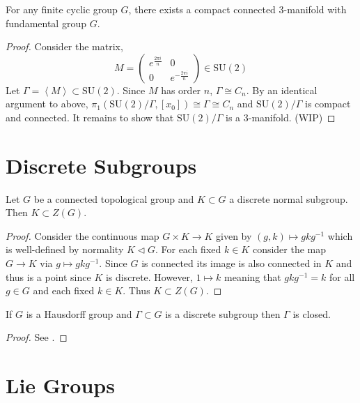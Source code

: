 \documentclass[12pt]{extarticle}
\newcommand{\SU}[1]{\mathrm{SU}(#1)}
\begin{document}
\begin{theorem}
For any finite cyclic group $G$, there exists a compact connected 3-manifold with fundamental group $G$.  
\end{theorem}

\begin{proof}
Consider the matrix,
\[
M = \begin{pmatrix}
e^{\frac{2 \pi i}{n}} & 0 \\
0 & e^{-\frac{2 \pi i}{n}}
\end{pmatrix} \in \SU{2}\]
Let $\Gamma = \left< M \right> \subset \SU{2}$. Since $M$ has order $n$, $\Gamma \cong C_n$. By an identical argument to above, $\pi_1(\SU{2}/\Gamma, [x_0]) \cong \Gamma \cong C_n$ and $\SU{2}/\Gamma$ is compact and connected. It remains to show that $\SU{2}/\Gamma$ is a 3-manifold. (WIP)
\end{proof}

\section{Discrete Subgroups}

\begin{proposition} \label{discrete_in_center}
Let $G$ be a connected topological group and $K \subset G$ a discrete normal subgroup. Then $K \subset Z(G)$. 
\end{proposition}

\begin{proof}
Consider the continuous map $G \times K \to K$ given by $(g, k) \mapsto g k g^{-1}$ which is well-defined by normality $K \triangleleft G$. For each fixed $k \in K$ consider the map $G \to K$ via $g \mapsto g k g^{-1}$. Since $G$ is connected its image is also connected in $K$ and thus is a point since $K$ is discrete. However, $1 \mapsto k$ meaning that $g k g^{-1} = k$ for all $g \in G$ and each fixed $k \in K$. Thus $K \subset Z(G)$. 
\end{proof}

\begin{prop}
If $G$ is a Hausdorff group and $\Gamma \subset G$ is a discrete subgroup then $\Gamma$ is closed.
\end{prop}

\begin{proof}
See .
\end{proof}

\section{Lie Groups}
\end{document}
